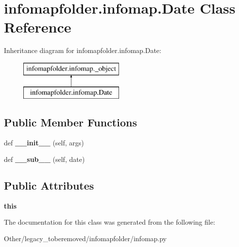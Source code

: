 \hypertarget{classinfomapfolder_1_1infomap_1_1Date}{}\section{infomapfolder.\+infomap.\+Date Class Reference}
\label{classinfomapfolder_1_1infomap_1_1Date}
Inheritance diagram for infomapfolder.\+infomap.\+Date\+:\begin{figure}[H]
\begin{center}
\leavevmode
\includegraphics[height=2.000000cm]{classinfomapfolder_1_1infomap_1_1Date}
\end{center}
\end{figure}
\subsection*{Public Member Functions}
\begin{DoxyCompactItemize}
\item 
\mbox{\label{classinfomapfolder_1_1infomap_1_1Date_a8c6b3e9d7ae40fdbb04e7374ef313d4e}} 
def {\bfseries \+\_\+\+\_\+init\+\_\+\+\_\+} (self, args)
\item 
\mbox{\label{classinfomapfolder_1_1infomap_1_1Date_a760f90d938e8e31659b86a8a60a8ed98}} 
def {\bfseries \+\_\+\+\_\+sub\+\_\+\+\_\+} (self, date)
\end{DoxyCompactItemize}
\subsection*{Public Attributes}
\begin{DoxyCompactItemize}
\item 
\mbox{\label{classinfomapfolder_1_1infomap_1_1Date_a86cee2eb3d7942143fdf1039e9a1250c}} 
{\bfseries this}
\end{DoxyCompactItemize}


The documentation for this class was generated from the following file\+:\begin{DoxyCompactItemize}
\item 
Other/legacy\+\_\+toberemoved/infomapfolder/infomap.\+py\end{DoxyCompactItemize}
